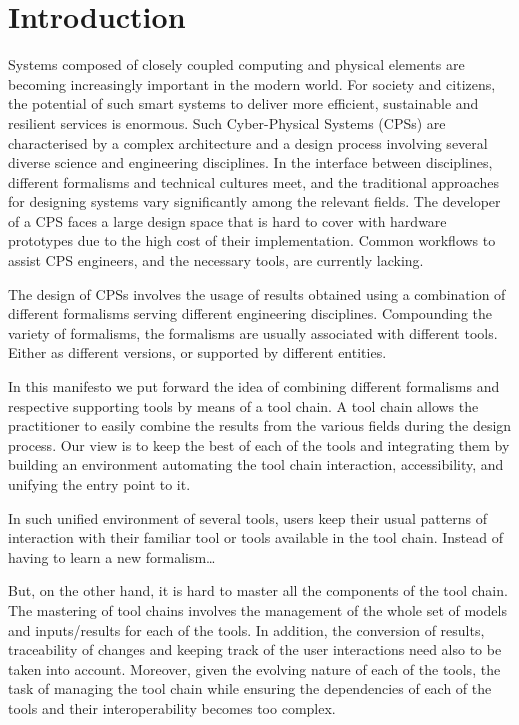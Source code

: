 
\section{Introduction}\label{sec:intro}


Systems composed of closely coupled computing and physical elements are becoming increasingly important in the modern world. For society and citizens, the potential of such smart systems to deliver more efficient, sustainable and resilient services is enormous.  Such Cyber-Physical Systems (CPSs) are characterised by a complex architecture and a design process involving several diverse science and engineering disciplines. In the interface between disciplines, different formalisms and technical cultures meet, and the traditional approaches for designing systems vary significantly among the relevant fields. The developer of a CPS faces a large design space that is hard to cover with hardware prototypes due to the high cost of their implementation. Common workflows to assist CPS engineers, and the necessary tools, are currently lacking.

The design of CPSs involves the usage of results obtained
using a combination of different formalisms serving different engineering
disciplines. Compounding the variety of formalisms, the formalisms are usually
associated with different tools. Either as different versions, or supported by 
different entities.

In this manifesto we put forward the idea of combining different formalisms and
respective supporting tools by means of a tool chain. A tool chain allows the
practitioner to easily combine the results from the various fields during the
design process.  Our view is to keep the best of each of the tools and
integrating them by building an environment automating the tool chain
interaction, accessibility, and unifying the entry point to it. 

In such unified environment of several tools, users keep their usual patterns
of interaction with their familiar tool or tools available in the tool chain.
Instead of having to learn a new formalism\ldots


But, on the other hand, it is hard to master all the components of the tool
chain.  The mastering of tool chains involves the management of the whole set
of models and inputs/results for each of the tools. In addition, the conversion
of results, traceability of changes and keeping track of the user interactions
need also to be taken into account.  Moreover, given the evolving nature of
each of the tools, the task of managing the tool chain while ensuring the
dependencies of each of the tools and their interoperability becomes too
complex. 

